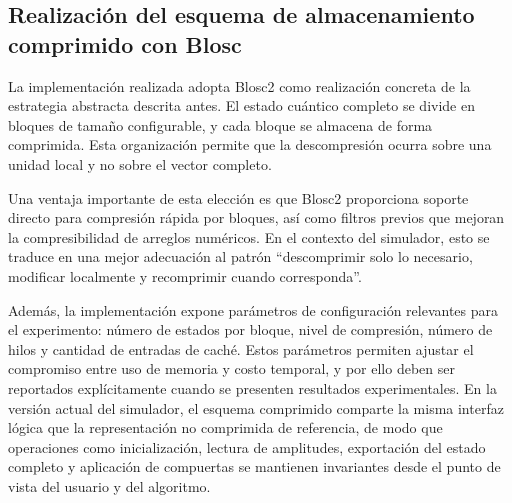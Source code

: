 \subsection{Realización del esquema de almacenamiento comprimido con Blosc}

La implementación realizada adopta Blosc2 como realización concreta de la estrategia abstracta descrita antes. El estado cuántico completo se divide
en bloques de tamaño configurable, y cada bloque se almacena de forma comprimida. Esta organización permite que la descompresión ocurra sobre una
unidad local y no sobre el vector completo.

Una ventaja importante de esta elección es que Blosc2 proporciona soporte directo para compresión rápida por bloques, así como filtros previos que
mejoran la compresibilidad de arreglos numéricos. En el contexto del simulador, esto se traduce en una mejor adecuación al patrón ``descomprimir
solo lo necesario, modificar localmente y recomprimir cuando corresponda''.

Además, la implementación expone parámetros de configuración relevantes para el experimento: número de estados por bloque, nivel de compresión, número de
hilos y cantidad de entradas de caché. Estos parámetros permiten ajustar el compromiso entre uso de memoria y costo temporal, y por ello deben ser
reportados explícitamente cuando se presenten resultados experimentales. En la versión actual del simulador, el esquema comprimido comparte la misma interfaz lógica que la representación no comprimida de referencia, de modo que operaciones como inicialización, lectura de amplitudes, exportación del estado completo y aplicación de compuertas se mantienen invariantes desde el punto de vista del usuario y del algoritmo.
